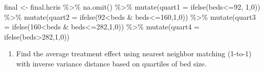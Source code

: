 \documentclass[
]{article}
\newenvironment{Shaded}{\begin{snugshade}}{\end{snugshade}}
\newcommand{\AttributeTok}[1]{\textcolor[rgb]{0.77,0.63,0.00}{#1}}
\newcommand{\DecValTok}[1]{\textcolor[rgb]{0.00,0.00,0.81}{#1}}
\newcommand{\FunctionTok}[1]{\textcolor[rgb]{0.00,0.00,0.00}{#1}}
\newcommand{\NormalTok}[1]{#1}
\newcommand{\OtherTok}[1]{\textcolor[rgb]{0.56,0.35,0.01}{#1}}
\newcommand{\SpecialCharTok}[1]{\textcolor[rgb]{0.00,0.00,0.00}{#1}}
\newcommand{\StringTok}[1]{\textcolor[rgb]{0.31,0.60,0.02}{#1}}
\providecommand{\tightlist}{%
  \setlength{\itemsep}{0pt}\setlength{\parskip}{0pt}}
\begin{document}
\begin{Shaded}
\begin{Highlighting}[]
\NormalTok{final }\OtherTok{\textless{}{-}}\NormalTok{ final.hcris }\SpecialCharTok{\%\textgreater{}\%}
  \FunctionTok{na.omit}\NormalTok{() }\SpecialCharTok{\%\textgreater{}\%}
  \FunctionTok{mutate}\NormalTok{(}\AttributeTok{quart1 =} \FunctionTok{ifelse}\NormalTok{(beds}\SpecialCharTok{\textless{}=}\DecValTok{92}\NormalTok{, }\DecValTok{1}\NormalTok{,}\DecValTok{0}\NormalTok{)) }\SpecialCharTok{\%\textgreater{}\%}
  \FunctionTok{mutate}\NormalTok{(}\AttributeTok{quart2 =} \FunctionTok{ifelse}\NormalTok{(}\DecValTok{92}\SpecialCharTok{\textless{}}\NormalTok{beds }\SpecialCharTok{\&}\NormalTok{ beds}\SpecialCharTok{\textless{}=}\DecValTok{160}\NormalTok{,}\DecValTok{1}\NormalTok{,}\DecValTok{0}\NormalTok{)) }\SpecialCharTok{\%\textgreater{}\%}
  \FunctionTok{mutate}\NormalTok{(}\AttributeTok{quart3 =} \FunctionTok{ifelse}\NormalTok{(}\DecValTok{160}\SpecialCharTok{\textless{}}\NormalTok{beds }\SpecialCharTok{\&}\NormalTok{ beds}\SpecialCharTok{\textless{}=}\DecValTok{282}\NormalTok{,}\DecValTok{1}\NormalTok{,}\DecValTok{0}\NormalTok{)) }\SpecialCharTok{\%\textgreater{}\%}
  \FunctionTok{mutate}\NormalTok{(}\AttributeTok{quart4 =} \FunctionTok{ifelse}\NormalTok{(beds}\SpecialCharTok{\textgreater{}}\DecValTok{282}\NormalTok{,}\DecValTok{1}\NormalTok{,}\DecValTok{0}\NormalTok{))}
\end{Highlighting}
\end{Shaded}

\begin{enumerate}
\def\labelenumi{\arabic{enumi}.}
\setcounter{enumi}{2}
\tightlist
\item
  Find the average treatment effect using nearest neighbor matching
  (1-to-1) with inverse variance distance based on quartiles of bed
  size.
\end{enumerate}

\begin{Shaded}
\end{Shaded}
\end{document}
